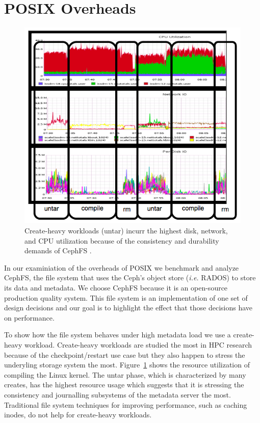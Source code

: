 \section{POSIX Overheads}
\label{sec:posix-overheads}

\begin{figure}[tb]
\centering
\includegraphics[width=1.0\linewidth]{figures/creates-motivation.png}
\caption{Create-heavy workloads (untar) incurr the highest disk, network, and
CPU utilization because of the consistency and durability demands of CephFS
.}\label{fig:creates-motivation}
\end{figure}

In our examiniation of the overheads of POSIX we benchmark and analyze CephFS,
the file system that uses the Ceph's object store ({\it i.e.} RADOS) to store
its data and metadata. We choose CephFS because it is an open-source production
quality system. This file system is an implementation of one set of design
decisions and our goal is to highlight the effect that those decisions have on
performance.

To show how the file system behaves under high metadata load we use a
create-heavy workload. Create-heavy workloads are studied the most in HPC
research because of the checkpoint/restart use case but they also happen to
stress the underyling storage system the most.
Figure~\ref{fig:creates-motivation} shows the resource utilization of compiling
the Linux kernel.  The untar phase, which is characterized by many creates, has
the highest resource usage which suggests that it is stressing the consistency
and journalling subsystems of the metadata server the most. Traditional file
system techniques for improving performance, such as caching inodes, do not
help for create-heavy workloads.

